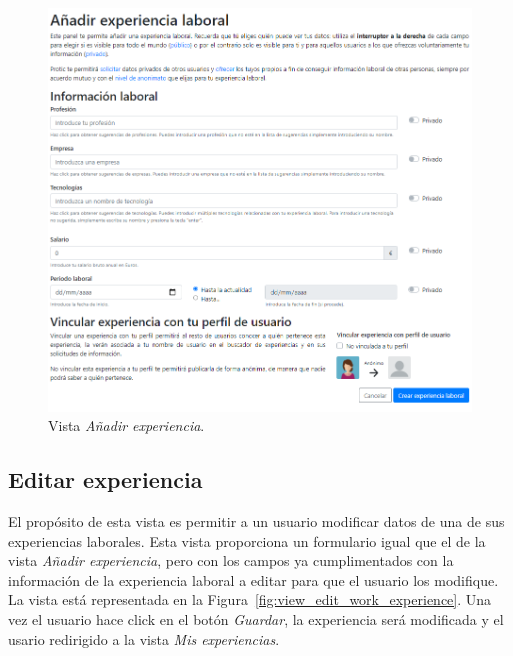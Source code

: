 \documentclass[a4paper, 12pt]{book}
\begin{document}
    \begin{figure}
        \centering
        \includegraphics[width=15cm, keepaspectratio]{img/create_we.PNG}
        \caption{Vista \emph{Añadir experiencia}.}\label{fig:view_add_work_experience}
    \end{figure}

    \subsection{Editar experiencia}
    \label{subsec:view_edit_work_experience}
    El propósito de esta vista es permitir a un usuario modificar datos de una de sus experiencias laborales.
    Esta vista proporciona un formulario igual que el de la vista \emph{Añadir experiencia}, pero con los campos ya cumplimentados con la información de la experiencia laboral a editar para que el usuario los modifique.
    La vista está representada en la Figura~\ref{fig:view_edit_work_experience}.
    Una vez el usuario hace click en el botón \emph{Guardar}, la experiencia será modificada y el usario redirigido a la vista \emph{Mis experiencias}.
\end{document}
